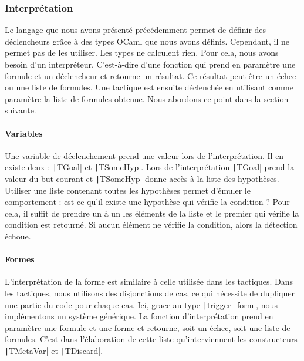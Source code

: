 \documentclass[french,titlepage]{article}
\begin{document}
\subsubsection{Interprétation} \label{realisation:langage_detecter:interpretation}
Le langage que nous avons présenté précédemment permet de définir des déclencheurs grâce à des types OCaml que nous avons définis. Cependant, il ne permet pas de les utiliser. Les types ne calculent rien. Pour cela, nous avons besoin d'un interpréteur. C'est-à-dire d'une fonction qui prend en paramètre une formule et un déclencheur et retourne un résultat. Ce résultat peut être un échec ou une liste de formules. Une tactique est ensuite déclenchée en utilisant comme paramètre la liste de formules obtenue. Nous abordons ce point dans la section suivante.

\paragraph{Variables} \label{realisation:langage_detecter:interpretation:variables}
Une variable de déclenchement prend une valeur lors de l'interprétation. Il en existe deux : \texttt|TGoal| et \texttt|TSomeHyp|. Lors de l'interprétation \texttt|TGoal| prend la valeur du but courant et \texttt|TSomeHyp| donne accès à la liste des hypothèses. Utiliser une liste contenant toutes les hypothèses permet d'émuler le comportement : est-ce qu'il existe une hypothèse qui vérifie la condition ? Pour cela, il suffit de prendre un à un les éléments de la liste et le premier qui vérifie la condition est retourné. Si aucun élément ne vérifie la condition, alors la détection échoue.

\paragraph{Formes} \label{realisation:langage_detecter:interpretation:formes}
L'interprétation de la forme est similaire à celle utilisée dans les tactiques. Dans les tactiques, nous utilisons des disjonctions de cas, ce qui nécessite de dupliquer une partie du code pour chaque cas. Ici, grace au type \texttt|trigger_form|, nous implémentons un système générique. La fonction d'interprétation prend en paramètre une formule et une forme et retourne, soit un échec, soit une liste de formules. C'est dans l'élaboration de cette liste qu'interviennent les constructeurs \texttt|TMetaVar| et \texttt|TDiscard|.
\end{document}

